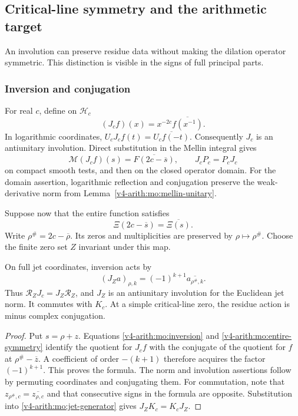 \subsection{Critical-line symmetry and the arithmetic target}

An involution can preserve residue data without making the dilation
operator symmetric. This distinction is visible in the signs of
full principal parts.

\subsubsection{Inversion and conjugation}

For real $c$, define on $\mathscr H_c$
\[
 (J_cf)(x)=x^{-2c}\overline{f(x^{-1})}.
\]
In logarithmic coordinates,
$U_cJ_cf(t)=\overline{U_cf(-t)}$. Consequently $J_c$ is an
antiunitary involution. Direct substitution in the Mellin integral
gives
\begin{equation}
 \mathcal M(J_cf)(s)=\overline{F(2c-\overline s)},
 \qquad J_cP_c=P_cJ_c
 \label{v4-arith:mo:inversion}
\end{equation}
on compact smooth tests, and then on the closed operator domain.
For the domain assertion, logarithmic reflection and conjugation
preserve the weak-derivative norm from
Lemma~\ref{v4-arith:mo:mellin-unitary}.

Suppose now that the entire function satisfies
\begin{equation}
 \Xi(2c-\overline s)=\overline{\Xi(s)}.
 \label{v4-arith:mo:entire-symmetry}
\end{equation}
Write $\rho^\#=2c-\overline\rho$. Its zeros and multiplicities
are preserved by $\rho\mapsto\rho^\#$. Choose the finite zero set
$Z$ invariant under this map.

\begin{proposition}
\label{v4-arith:mo:residue-involution}
On full jet coordinates, inversion acts by
\[
 (J_Za)_{\rho,k}=(-1)^{k+1}\overline{a_{\rho^\#,k}}.
\]
Thus $\mathcal R_ZJ_c=J_Z\mathcal R_Z$, and $J_Z$ is an
antiunitary involution for the Euclidean jet norm. It commutes
with $K_c$. At a simple critical-line zero, the residue action
is minus complex conjugation.
\end{proposition}
\begin{proof}
Put $s=\rho+z$. Equations \eqref{v4-arith:mo:inversion} and
\eqref{v4-arith:mo:entire-symmetry} identify the quotient for $J_cf$ with
the conjugate of the quotient for $f$ at
$\rho^\#-\overline z$. A coefficient of order $-(k+1)$ therefore
acquires the factor $(-1)^{k+1}$. This proves the formula.
The norm and involution assertions follow by permuting coordinates
and conjugating them. For commutation, note that
$z_{\rho^\#,c}=\overline{z_{\rho,c}}$ and that consecutive signs
in the formula are opposite. Substitution into
\eqref{v4-arith:mo:jet-generator} gives $J_ZK_c=K_cJ_Z$.
\end{proof}


